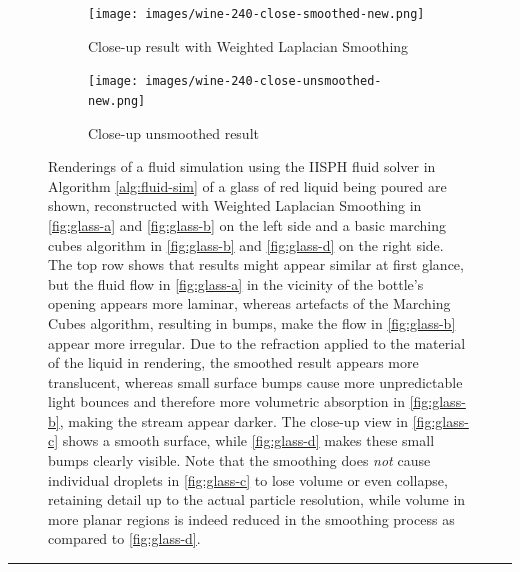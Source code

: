 \documentclass[oneside, a4paper]{book}
\newcommand\horizontalspacer[0]{\vspace{5pt}\noindent\textcolor{lightgray}{\rule{\textwidth}{1mm}}
\vspace{5pt}}
\begin{document}
\begin{figure}
    \begin{subfigure}[t][0.5\textwidth]{0.5\textwidth}
      \texttt{[image: images/wine-240-close-smoothed-new.png]}
      \caption{Close-up result with Weighted Laplacian Smoothing}
      \label{fig:glass-c}
    \end{subfigure}%
    \begin{subfigure}[t][0.5\textwidth]{0.5\textwidth}
      \texttt{[image: images/wine-240-close-unsmoothed-new.png]}
      \caption{Close-up unsmoothed result}
      \label{fig:glass-d}
    \end{subfigure}
    \vspace{0.5cm}
    \caption{Renderings of a fluid simulation using the IISPH fluid solver in Algorithm \ref{alg:fluid-sim} of a glass of red liquid being poured are shown, reconstructed with Weighted Laplacian Smoothing in \autoref{fig:glass-a} and \autoref{fig:glass-b} on the left side and a basic marching cubes algorithm in \autoref{fig:glass-b} and \autoref{fig:glass-d} on the right side. The top row shows that results might appear similar at first glance, but the fluid flow in \autoref{fig:glass-a} in the vicinity of the bottle's opening appears more laminar, whereas artefacts of the Marching Cubes algorithm, resulting in bumps, make the flow in \autoref{fig:glass-b} appear more irregular. Due to the refraction applied to the material of the liquid in rendering, the smoothed result appears more translucent, whereas small surface bumps cause more unpredictable light bounces and therefore more volumetric absorption in \autoref{fig:glass-b}, making the stream appear darker. The close-up view in \autoref{fig:glass-c} shows a smooth surface, while \autoref{fig:glass-d} makes these small bumps clearly visible. Note that the smoothing does \textit{not} cause individual droplets in \autoref{fig:glass-c} to lose volume or even collapse, retaining detail up to the actual particle resolution, while volume in more planar regions is indeed reduced in the smoothing process as compared to \autoref{fig:glass-d}.}
    \label{fig:surface-reconstruction}
  \end{figure}

  \horizontalspacer
  
\end{document}
